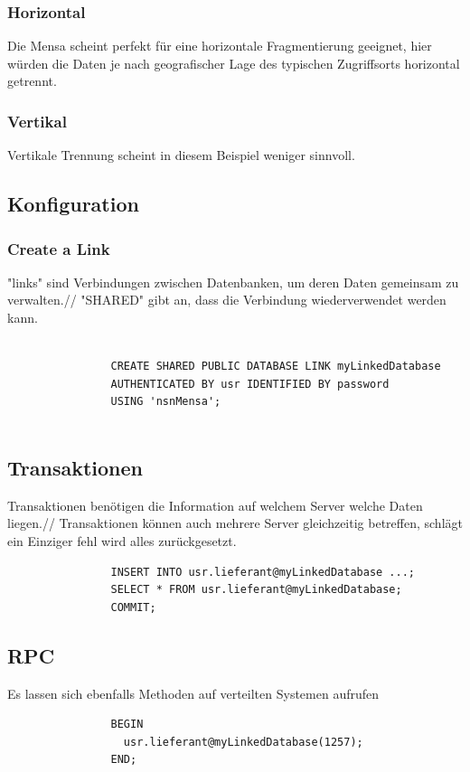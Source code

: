 \documentclass[12pt,a4paper]{article}
\begin{document}
			\subsubsection{Horizontal}
				Die Mensa scheint perfekt für eine horizontale Fragmentierung geeignet, hier würden die Daten je nach geografischer Lage des typischen Zugriffsorts horizontal getrennt.
			\subsubsection{Vertikal}
				Vertikale Trennung scheint in diesem Beispiel weniger sinnvoll.
		\subsection{Konfiguration}
			\subsubsection{Create a Link}
			
				"links" sind Verbindungen zwischen Datenbanken, um deren Daten gemeinsam zu verwalten.//
				"SHARED" gibt an, dass die Verbindung wiederverwendet werden kann.
				\begin{verbatim}

				CREATE SHARED PUBLIC DATABASE LINK myLinkedDatabase
				AUTHENTICATED BY usr IDENTIFIED BY password
				USING 'nsnMensa';
				
				\end{verbatim}
				
        \subsection{Transaktionen}
            Transaktionen benötigen die Information auf welchem Server welche Daten liegen.//
            Transaktionen können auch mehrere Server gleichzeitig betreffen, schlägt ein Einziger fehl wird alles zurückgesetzt.
            \begin{verbatim}
                INSERT INTO usr.lieferant@myLinkedDatabase ...;
                SELECT * FROM usr.lieferant@myLinkedDatabase;
                COMMIT;
	        \end{verbatim}
        \subsection{RPC}
            Es lassen sich ebenfalls Methoden auf verteilten Systemen aufrufen
            \begin{verbatim}
                BEGIN
                  usr.lieferant@myLinkedDatabase(1257);
                END;
            \end{verbatim}
\end{document}
